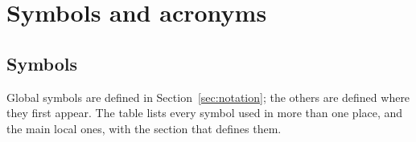 \section{Symbols and acronyms}
\label{app:notation}

\subsection{Symbols}

Global symbols are defined in Section~\ref{sec:notation}; the others are defined where they first
appear. The table lists every symbol used in more than one place, and the main local ones, with the
section that defines them.

